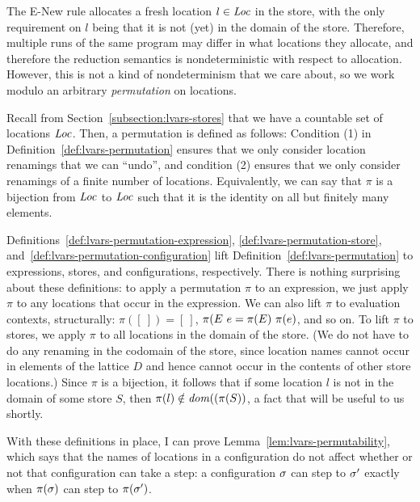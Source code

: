The {\sc E-New} rule allocates a fresh location $l \in \mathit{Loc}$ in the
store, with the only requirement on $l$ being that it is not (yet) in
the domain of the store.  Therefore, multiple runs of the same program
may differ in what locations they allocate, and therefore the
reduction semantics is nondeterministic with respect to allocation.
However, this is not a kind of nondeterminism that we care about, so
we work modulo an arbitrary \emph{permutation} on locations.

Recall from Section~\ref{subsection:lvars-stores} that we have a
countable set of locations $\mathit{Loc}$.  Then, a permutation is defined as
follows:
\LVarsDefPermutation
Condition (1) in Definition~\ref{def:lvars-permutation} ensures that
we only consider location renamings that we can ``undo'', and
condition (2) ensures that we only consider renamings of a finite
number of locations.  Equivalently, we can say that $\pi$ is a
bijection from $\mathit{Loc}$ to $\mathit{Loc}$ such that it is the identity on all
but finitely many elements.

Definitions~\ref{def:lvars-permutation-expression},
\ref{def:lvars-permutation-store},
and~\ref{def:lvars-permutation-configuration} lift
Definition~\ref{def:lvars-permutation} to expressions, stores, and
configurations, respectively.  There is nothing surprising about these
definitions: to apply a permutation $\pi$ to an expression, we just
apply $\pi$ to any locations that occur in the expression.  We can
also lift $\pi$ to evaluation contexts, structurally: $\pi([~]) =
[~]$, $\pi(E~e = \pi(E)~\pi(e)$, and so on.  To lift
$\pi$ to stores, we apply $\pi$ to all locations in the domain of the
store.  (We do not have to do any renaming in the codomain of the
store, since location names cannot occur in elements of the lattice
$D$ and hence cannot occur in the contents of other store locations.)
Since $\pi$ is a bijection, it follows that if some location $l$ is
not in the domain of some store $S$, then $\pi(l) \notin
\mathit{dom}((\pi(S))$, a fact
that will be useful to us shortly.

\LVarsDefPermutationExpression

\LVarsDefPermutationStore

\LVarsDefPermutationConfiguration

With these definitions in place, I can prove
Lemma~\ref{lem:lvars-permutability}, which says that the names of
locations in a configuration do not affect whether or not that
configuration can take a step: a configuration $\sigma$ can step to
$\sigma'$ exactly when $\pi(\sigma)$ can step to $\pi(\sigma')$.

